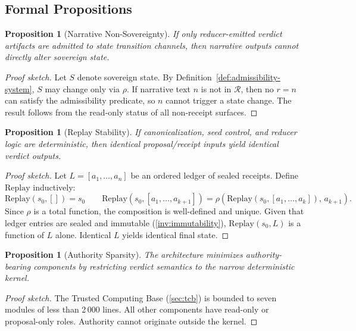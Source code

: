 \documentclass[11pt,a4paper]{article}
\theoremstyle{plain}
\newtheorem{proposition}[theorem]{Proposition}
\theoremstyle{definition}
\theoremstyle{remark}
\newcommand{\Replay}{\mathrm{Replay}}
\newcommand{\Rec}{\mathcal{R}}
\newcommand{\red}{\rho}
\begin{document}
\subsection{Formal Propositions}

\begin{proposition}[Narrative Non-Sovereignty]
\label{prop:non-sovereignty}
If only reducer-emitted verdict artifacts are admitted to state transition channels,
then narrative outputs cannot directly alter sovereign state.
\end{proposition}

\begin{proof}[Proof sketch]
Let $S$ denote sovereign state.
By Definition~\ref{def:admissibility-system}, $S$ may change only via $\red$.
If narrative text $n$ is not in $\Rec$, then no $r = n$ can satisfy the
admissibility predicate, so $n$ cannot trigger a state change.
The result follows from the read-only status of all non-receipt surfaces.
\end{proof}

\begin{proposition}[Replay Stability]
\label{prop:replay}
If canonicalization, seed control, and reducer logic are deterministic,
then identical proposal/receipt inputs yield identical verdict outputs.
\end{proposition}

\begin{proof}[Proof sketch]
Let $L = [a_1, \ldots, a_n]$ be an ordered ledger of sealed receipts.
Define $\Replay$ inductively:
\[
  \Replay(s_0, []) = s_0
  \qquad
  \Replay(s_0, [a_1, \ldots, a_{k+1}]) = \red(\Replay(s_0, [a_1,\ldots,a_k]),\, a_{k+1}).
\]
Since $\red$ is a total function, the composition is well-defined and unique.
Given that ledger entries are sealed and immutable (\cref{inv:immutability}),
$\Replay(s_0, L)$ is a function of $L$ alone.
Identical $L$ yields identical final state.
\end{proof}

\begin{proposition}[Authority Sparsity]
\label{prop:sparsity}
The architecture minimizes authority-bearing components by restricting
verdict semantics to the narrow deterministic kernel.
\end{proposition}

\begin{proof}[Proof sketch]
The Trusted Computing Base (\cref{sec:tcb}) is bounded to seven modules
of less than 2\,000 lines.
All other components have read-only or proposal-only roles.
Authority cannot originate outside the kernel.
\end{proof}
\end{document}
